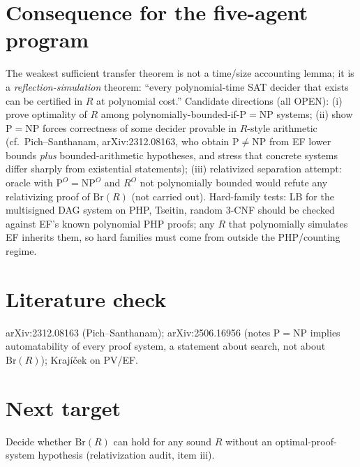 \documentclass{article}\usepackage{amsmath,amssymb,amsthm}
\begin{document}
\section*{Consequence for the five-agent program}
The weakest sufficient transfer theorem is not a time/size accounting lemma; it is a \emph{reflection-simulation} theorem: ``every polynomial-time SAT decider that exists can be certified in $R$ at polynomial cost.'' Candidate directions (all OPEN): (i) prove optimality of $R$ among polynomially-bounded-if-$\mathrm P=\mathrm{NP}$ systems; (ii) show $\mathrm P=\mathrm{NP}$ forces correctness of some decider provable in $R$-style arithmetic (cf.\ Pich--Santhanam, arXiv:2312.08163, who obtain $\mathrm P\ne\mathrm{NP}$ from EF lower bounds \emph{plus} bounded-arithmetic hypotheses, and stress that concrete systems differ sharply from existential statements); (iii) relativized separation attempt: oracle with $\mathrm P^O=\mathrm{NP}^O$ and $R^O$ not polynomially bounded would refute any relativizing proof of $\mathrm{Br}(R)$ (not carried out).
Hard-family tests: $\mathrm{LB}$ for the multisigned DAG system on PHP, Tseitin, random 3-CNF should be checked against EF's known polynomial PHP proofs; any $R$ that polynomially simulates EF inherits them, so hard families must come from outside the PHP/counting regime.

\section*{Literature check}
arXiv:2312.08163 (Pich--Santhanam); arXiv:2506.16956 (notes $\mathrm P=\mathrm{NP}$ implies automatability of every proof system, a statement about search, not about $\mathrm{Br}(R)$); Krajíček on PV/EF.

\section*{Next target}
Decide whether $\mathrm{Br}(R)$ can hold for any sound $R$ without an optimal-proof-system hypothesis (relativization audit, item iii).
\end{document}
